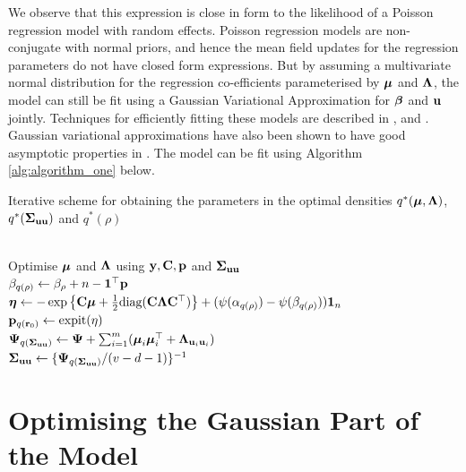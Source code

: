 We observe that this expression is close in form to the likelihood of a Poisson regression model with random
effects. Poisson regression models are non-conjugate with normal priors, and hence the mean field updates for
the regression parameters do not have closed form expressions. But by assuming a multivariate normal
distribution for the regression co-efficients parameterised by ${\boldsymbol \mu}$ and ${\boldsymbol \Lambda}$, the model can still be
fit using a Gaussian Variational Approximation for ${\boldsymbol \beta}$ and ${\bf u}$ jointly. Techniques for efficiently
fitting these models are described in \cite{Ormerod2012}, \cite{Challis2013} and \cite{Opper2009}. Gaussian
variational approximations have also been shown to have good asymptotic properties in \cite{Sinica2017}. The
model can be fit using Algorithm \ref{alg:algorithm_one} below.

\begin{algorithm}
	\caption[Algorithm 1]{Iterative scheme for obtaining the parameters in the
		optimal densities $q^*({\boldsymbol \mu}, {\boldsymbol \Lambda})$, $q^*({\boldsymbol \Sigma}_{{\bf u} {\bf u}})$ and $q^*(\rho)$}
	\label{alg:algorithm_one}
	\begin{algorithmic}
		 \\[1ex]
			\STATE Optimise ${\boldsymbol \mu}$ and ${\boldsymbol \Lambda}$ using ${\bf y}, {\bf C}, {\bf p}$ and ${\boldsymbol \Sigma}_{{\bf u} {\bf u}}$ \\[1ex]
			\STATE $\beta_{q(\rho)} \leftarrow \beta_\rho + n - {\bf 1}^\top{\bf p}$ \\[1ex]
			\STATE ${\boldsymbol \eta} \leftarrow -\exp \left \{ {\bf C} {\boldsymbol \mu} + \frac{1}{2} \text{diag}{({\bf C}{\boldsymbol\Lambda}{\bf C}^\top)} \right \} + (\psi{(\alpha_{q{(\rho)}})} - \psi{(\beta_{q{(\rho)}})}) {\bf 1}_n$ \\[1ex]
			\STATE ${\bf p}_{q({\bf r}_0)} \leftarrow \text{expit}{(\eta)}$ \\[1ex]
			\STATE ${\boldsymbol \Psi}_{q({\boldsymbol \Sigma}_{{\bf u} {\bf u}})} \leftarrow {\boldsymbol\Psi} + \sum_{i=1}^m ({\boldsymbol \mu}_i {\boldsymbol \mu}_i^\top + {\boldsymbol \Lambda}_{{{\bf u}}_i {{\bf u}}_i})$ \\[1ex]
			\STATE ${\boldsymbol \Sigma}_{{\bf u}{\bf u}} \leftarrow \{{\boldsymbol \Psi}_{q({\boldsymbol \Sigma}_{{\bf u} {\bf u}})}/(v - d - 1)\}^{-1}$
		\ENDWHILE
	\end{algorithmic}
\end{algorithm}
						
\section{Optimising the Gaussian Part of the Model}
\label{sec:gaussian}

